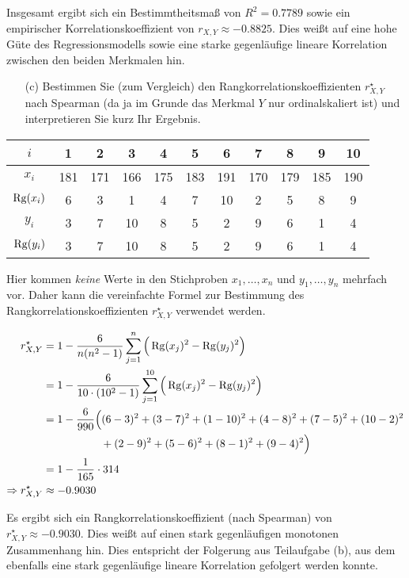 Insgesamt ergibt sich ein Bestimmtheitsmaß von $R^2=0.7789$ sowie ein empirischer Korrelationskoeffizient von $r_{X,Y}\approx -0.8825$. Dies weißt auf eine hohe Güte des Regressionsmodells sowie eine starke gegenläufige lineare Korrelation zwischen den beiden Merkmalen hin.


\begin{task}
    \begin{enumerate}
        \item[(c)] Bestimmen Sie (zum Vergleich) den Rangkorrelationskoeffizienten $r_{X,Y}^\star$ nach Spearman (da ja im Grunde das Merkmal $Y$ nur ordinalskaliert ist) und interpretieren Sie kurz Ihr Ergebnis.
    \end{enumerate}
\end{task}

\begin{table}[H]
\centering
\begin{tabular}{c|cccccccccc}
    $i$        & 1   & 2   & 3   & 4   & 5   & 6   & 7   & 8   & 9   & 10  \\ \hline\hline

    $x_i$      & 181 & 171 & 166 & 175 & 183 & 191 & 170 & 179 & 185 & 190 \\
    $\operatorname{Rg}(x_i)$ & 6   & 3   & 1   & 4   & 7   & 10  & 2   & 5   & 8   & 9   \\ \hline\hline

    $y_i$      & 3   & 7   & 10  & 8   & 5   & 2   & 9   & 6   & 1   & 4   \\
    $\operatorname{Rg}(y_i)$ & 3   & 7   & 10  & 8   & 5   & 2   & 9   & 6   & 1   & 4
\end{tabular}
\end{table}

Hier kommen \emph{keine} Werte in den Stichproben $x_1,\ldots,x_n$ und $y_1,\ldots,y_n$ mehrfach vor. Daher kann die vereinfachte Formel zur Bestimmung des Rangkorrelationskoeffizienten $r^\star_{X,Y}$ verwendet werden.

\begin{align*}
    r_{X,Y}^\star &= 1- \frac{6}{n(n^2-1)} \sum_{j=1}^{n} \Big(\operatorname{Rg}(x_j)^2 - \operatorname{Rg}(y_j)^2\Big) \\
    &= 1 - \frac{6}{10\cdot(10^2-1)} \sum_{j=1}^{10} \Big(\operatorname{Rg}(x_j)^2 - \operatorname{Rg}(y_j)^2\Big) \\
    &= 1 - \frac{6}{990} \Big( (6-3)^2 + (3-7)^2 + (1-10)^2 + (4-8)^2 + (7-5)^2 + (10-2)^2 \\
    &\qquad\qquad\quad~ + (2-9)^2 + (5-6)^2 + (8-1)^2 + (9-4)^2 \Big) \\
    &= 1 - \frac{1}{165}\cdot 314 \\
    \Rightarrow r_{X,Y}^\star &\approx -0.9030
\end{align*}

Es ergibt sich ein Rangkorrelationskoeffizient (nach Spearman) von $r_{X,Y}^\star \approx -0.9030$. Dies weißt auf einen stark gegenläufigen monotonen Zusammenhang hin. Dies entspricht der Folgerung aus Teilaufgabe (b), aus dem ebenfalls eine stark gegenläufige lineare Korrelation gefolgert werden konnte.
